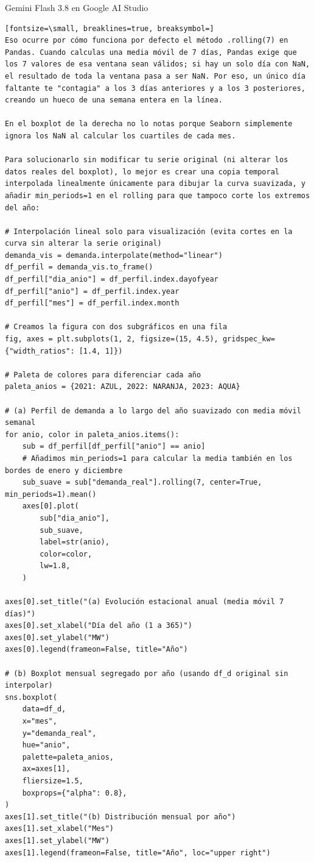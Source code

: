 \documentclass[12pt,a4paper,oneside]{book}
\begin{document}
\begin{iaresp}{Gemini Flash 3.8 en Google AI Studio}
\begin{Verbatim}[fontsize=\small, breaklines=true, breaksymbol=]
Eso ocurre por cómo funciona por defecto el método .rolling(7) en Pandas. Cuando calculas una media móvil de 7 días, Pandas exige que los 7 valores de esa ventana sean válidos; si hay un solo día con NaN, el resultado de toda la ventana pasa a ser NaN. Por eso, un único día faltante te "contagia" a los 3 días anteriores y a los 3 posteriores, creando un hueco de una semana entera en la línea.

En el boxplot de la derecha no lo notas porque Seaborn simplemente ignora los NaN al calcular los cuartiles de cada mes.

Para solucionarlo sin modificar tu serie original (ni alterar los datos reales del boxplot), lo mejor es crear una copia temporal interpolada linealmente únicamente para dibujar la curva suavizada, y añadir min_periods=1 en el rolling para que tampoco corte los extremos del año:

# Interpolación lineal solo para visualización (evita cortes en la curva sin alterar la serie original)
demanda_vis = demanda.interpolate(method="linear")
df_perfil = demanda_vis.to_frame()
df_perfil["dia_anio"] = df_perfil.index.dayofyear
df_perfil["anio"] = df_perfil.index.year
df_perfil["mes"] = df_perfil.index.month

# Creamos la figura con dos subgráficos en una fila
fig, axes = plt.subplots(1, 2, figsize=(15, 4.5), gridspec_kw={"width_ratios": [1.4, 1]})

# Paleta de colores para diferenciar cada año
paleta_anios = {2021: AZUL, 2022: NARANJA, 2023: AQUA}

# (a) Perfil de demanda a lo largo del año suavizado con media móvil semanal
for anio, color in paleta_anios.items():
    sub = df_perfil[df_perfil["anio"] == anio]
    # Añadimos min_periods=1 para calcular la media también en los bordes de enero y diciembre
    sub_suave = sub["demanda_real"].rolling(7, center=True, min_periods=1).mean()
    axes[0].plot(
        sub["dia_anio"],
        sub_suave,
        label=str(anio),
        color=color,
        lw=1.8,
    )

axes[0].set_title("(a) Evolución estacional anual (media móvil 7 días)")
axes[0].set_xlabel("Día del año (1 a 365)")
axes[0].set_ylabel("MW")
axes[0].legend(frameon=False, title="Año")

# (b) Boxplot mensual segregado por año (usando df_d original sin interpolar)
sns.boxplot(
    data=df_d,
    x="mes",
    y="demanda_real",
    hue="anio",
    palette=paleta_anios,
    ax=axes[1],
    fliersize=1.5,
    boxprops={"alpha": 0.8},
)
axes[1].set_title("(b) Distribución mensual por año")
axes[1].set_xlabel("Mes")
axes[1].set_ylabel("MW")
axes[1].legend(frameon=False, title="Año", loc="upper right")


\end{Verbatim}
\end{iaresp}
\end{document}
